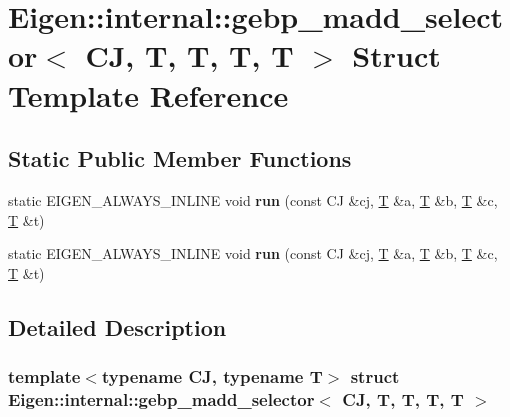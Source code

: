 \hypertarget{struct_eigen_1_1internal_1_1gebp__madd__selector_3_01_c_j_00_01_t_00_01_t_00_01_t_00_01_t_01_4}{}\section{Eigen\+:\+:internal\+:\+:gebp\+\_\+madd\+\_\+selector$<$ CJ, T, T, T, T $>$ Struct Template Reference}
\label{struct_eigen_1_1internal_1_1gebp__madd__selector_3_01_c_j_00_01_t_00_01_t_00_01_t_00_01_t_01_4}
\subsection*{Static Public Member Functions}
\begin{DoxyCompactItemize}
\item 
\mbox{\label{struct_eigen_1_1internal_1_1gebp__madd__selector_3_01_c_j_00_01_t_00_01_t_00_01_t_00_01_t_01_4_a9c7067aeacff0a1010ede59f4cd74f49}} 
static E\+I\+G\+E\+N\+\_\+\+A\+L\+W\+A\+Y\+S\+\_\+\+I\+N\+L\+I\+NE void {\bfseries run} (const CJ \&cj, \hyperlink{group___sparse_core___module}{T} \&a, \hyperlink{group___sparse_core___module}{T} \&b, \hyperlink{group___sparse_core___module}{T} \&c, \hyperlink{group___sparse_core___module}{T} \&t)
\item 
\mbox{\label{struct_eigen_1_1internal_1_1gebp__madd__selector_3_01_c_j_00_01_t_00_01_t_00_01_t_00_01_t_01_4_a9c7067aeacff0a1010ede59f4cd74f49}} 
static E\+I\+G\+E\+N\+\_\+\+A\+L\+W\+A\+Y\+S\+\_\+\+I\+N\+L\+I\+NE void {\bfseries run} (const CJ \&cj, \hyperlink{group___sparse_core___module}{T} \&a, \hyperlink{group___sparse_core___module}{T} \&b, \hyperlink{group___sparse_core___module}{T} \&c, \hyperlink{group___sparse_core___module}{T} \&t)
\end{DoxyCompactItemize}


\subsection{Detailed Description}
\subsubsection*{template$<$typename CJ, typename T$>$\newline
struct Eigen\+::internal\+::gebp\+\_\+madd\+\_\+selector$<$ C\+J, T, T, T, T $>$}



